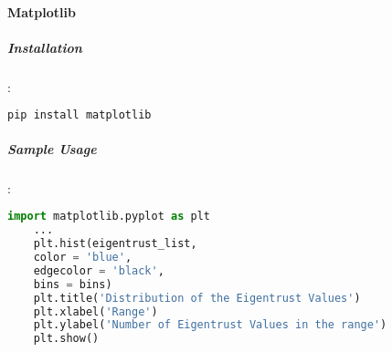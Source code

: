 	\paragraph{Matplotlib}
	\subparagraph{Installation}:
	\begin{lstlisting}[language=bash]
	pip install matplotlib
	\end{lstlisting}
	
	\subparagraph{Sample Usage}:
	\begin{lstlisting}[language=python, caption=Matplotlib example]
	import matplotlib.pyplot as plt
	...
	plt.hist(eigentrust_list, 
	color = 'blue', 
	edgecolor = 'black',
	bins = bins)
	plt.title('Distribution of the Eigentrust Values')
	plt.xlabel('Range')
	plt.ylabel('Number of Eigentrust Values in the range')
	plt.show() 
	\end{lstlisting}